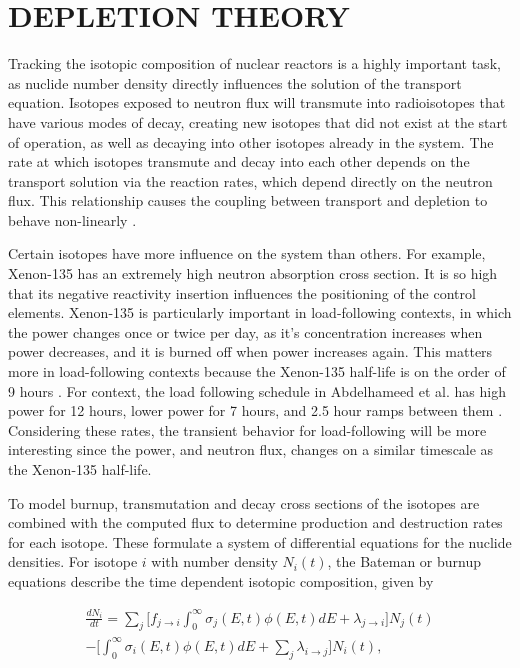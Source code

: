 \documentclass[letterpaper]{physor2024}
\begin{document}
\section{DEPLETION THEORY}\label{sec:depletion}
Tracking the isotopic composition of nuclear reactors is a highly important task, as nuclide number density directly influences the solution of the transport equation. Isotopes exposed to neutron flux will transmute into radioisotopes that have various modes of decay, creating new isotopes that did not exist at the start of operation, as well as decaying into other isotopes already in the system. The rate at which isotopes transmute and decay into each other depends on the transport solution via the reaction rates, which depend directly on the neutron flux. This relationship causes the coupling between transport and depletion to behave non-linearly \cite{romano-depletion-2021}.

Certain isotopes have more influence on the system than others. For example, Xenon-135 has an extremely high neutron absorption cross section. It is so high that its negative reactivity insertion influences the positioning of the control elements. Xenon-135 is particularly important in load-following contexts, in which the power changes once or twice per day, as it's concentration increases when power decreases, and it is burned off when power increases again. This matters more in load-following contexts because the Xenon-135 half-life is on the order of 9 hours \cite{d-and-h}. For context, the load following schedule in Abdelhameed et al. has high power for 12 hours, lower power for 7 hours, and 2.5 hour ramps between them \cite{Abdelhameed-ANS-2022}. Considering these rates, the transient behavior for load-following will be more interesting since the power, and neutron flux, changes on a similar timescale as the Xenon-135 half-life.

To model burnup, transmutation and decay cross sections of the isotopes are combined with the computed flux to determine production and destruction rates for each isotope. These formulate a system of differential equations for the nuclide densities. For isotope $i$ with number density $N_{i}(t)$, the Bateman or burnup equations describe the time dependent isotopic composition, given by

\begin{multline} \label{eq:batemen}
    \frac{dN_{i}}{dt} =
    \sum_{j} \bigg[f_{j\rightarrow{i}}\int_{0}^{\infty} \sigma_{j}(E,t)\phi(E,t)dE + \lambda_{j\rightarrow{i}}\bigg]N_{j}(t) \\
    -\bigg[\int_{0}^{\infty} \sigma_{i}(E,t)\phi(E,t)dE
    +\sum_{j}\lambda_{i\rightarrow{j}}\bigg] N_{i}(t),
\end{multline}
\end{document}
